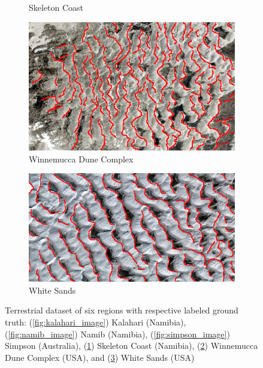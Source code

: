 \begin{figure}[htbp]
\begin{subfigure}[b]{0.3\textwidth}
		\caption{ Skeleton Coast }
		\label{fig:skeleton_coast_image}
	\end{subfigure}
	\begin{subfigure}[b]{0.3\textwidth}
		\centering
		\includegraphics[width=\textwidth]{figures/wdc_with_gt}
		\caption{  Winnemucca Dune Complex }
		\label{fig:wdc_image}
	\end{subfigure}
	\begin{subfigure}[b]{0.3\textwidth}
		\centering
		\includegraphics[width=\textwidth]{figures/whitesands_with_gt}
		\caption{ White Sands }
		\label{fig:white_sands_image}
	\end{subfigure}
	\caption{Terrestrial dataset of six regions with respective labeled ground truth: (\ref{fig:kalahari_image}) Kalahari (Namibia), (\ref{fig:namib_image}) Namib (Namibia), (\ref{fig:simpson_image}) Simpson (Australia), (\ref{fig:skeleton_coast_image}) Skeleton Coast (Namibia), (\ref{fig:wdc_image}) Winnemucca Dune Complex (USA), and (\ref{fig:white_sands_image}) White Sands (USA)}
	\label{fig:terrestrial_dataset}
\end{figure}

